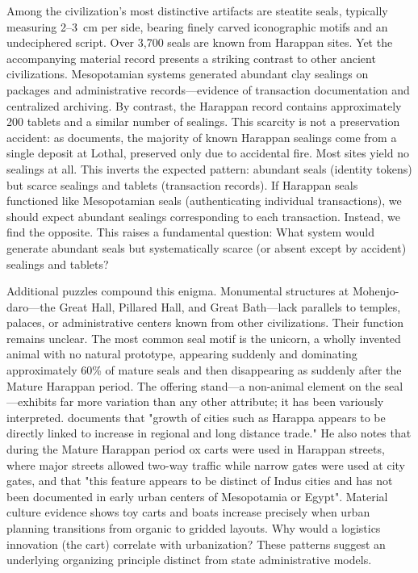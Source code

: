 \documentclass[12pt]{article}
\begin{document}
Among the civilization's most distinctive artifacts are steatite seals, typically
measuring 2--3~cm per side, bearing finely carved iconographic motifs and an
undeciphered script. Over 3,700 seals are known from Harappan sites. Yet the
accompanying material record presents a striking contrast to other ancient
civilizations. Mesopotamian systems generated abundant clay sealings on packages
and administrative records---evidence of transaction documentation and centralized
archiving. By contrast, the Harappan record contains approximately 200 tablets and
a similar number of sealings. This scarcity is not a preservation accident: as
\citet{frenez2024} documents, the majority of known Harappan sealings come from a
single deposit at Lothal, preserved only due to accidental fire. Most sites yield
no sealings at all. This inverts the expected pattern: abundant seals (identity
tokens) but scarce sealings and tablets (transaction records). If Harappan seals
functioned like Mesopotamian seals (authenticating individual transactions), we
should expect abundant sealings corresponding to each transaction. Instead, we
find the opposite. This raises a fundamental question: What system would generate
abundant seals but systematically scarce (or absent except by accident) sealings and
tablets?

Additional puzzles compound this enigma. Monumental structures at Mohenjo-daro---the
Great Hall, Pillared Hall, and Great Bath---lack parallels to temples, palaces, or
administrative centers known from other civilizations. Their function remains unclear.
The most common seal motif is the unicorn, a wholly invented animal with no natural
prototype, appearing suddenly and dominating approximately 60\% of mature seals and
then disappearing as suddenly after the Mature Harappan period. The
offering stand---a non-animal element on the seal---exhibits far more variation than
any other attribute; it has been variously interpreted. \citet{kenoyer2005indus}
documents that "growth of cities such as Harappa appears to be directly linked to
increase in regional and long distance trade." He also notes that during the
Mature Harappan period ox carts were used in Harappan streets, where major streets
allowed two-way traffic while narrow gates were used at city gates, and that
"this feature appears to be distinct of Indus cities and has not been documented
in early urban centers of Mesopotamia or Egypt". Material culture evidence
shows toy carts and boats increase precisely when urban planning transitions from
organic to gridded layouts. Why would a logistics innovation (the cart) correlate
with urbanization? These patterns suggest an underlying organizing principle distinct
from state administrative models.
\end{document}
